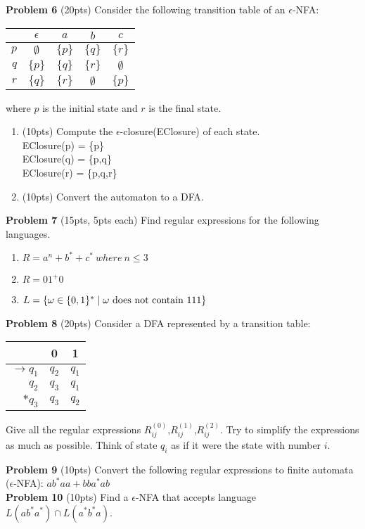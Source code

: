 \documentclass{article}
\begin{document}
\noindent \textbf{Problem 6} (20pts) Consider the following transition table of an $\epsilon$-NFA:
    \begin{center}
    \small
        \begin{tabular}{r||c|c|c|c}
        & $\epsilon$ & $a$ & $b$ & $c$\\ \hline\hline
        $p$ & $\emptyset$ & $\{p\}$ & $\{q\}$ & $\{r\}$\\ 
        $q$ & $\{p\}$ & $\{q\}$ & $\{r\}$ & $\emptyset$\\ 
        $r$ & $\{q\}$ & $\{r\}$ & $\emptyset$ & $\{p\}$\\ 
        \end{tabular}
    \end{center}
    where $p$ is the initial state and $r$ is the final state.
    \begin{enumerate}
        \item (10pts) Compute the $\epsilon$-closure(EClosure) of each state.\\
EClosure(p) = \{p\}\\
EClosure(q) = \{p,q\}\\
EClosure(r) = \{p,q,r\}\\

        \item (10pts) Convert the automaton to a DFA.
    \end{enumerate}
    
\noindent \textbf{Problem 7} (15pts, 5pts each) Find regular expressions for the following languages.
\begin{enumerate}
    \item $R = a^n+b^*+c^* \ where\ n \leq3$
    \item $R=01^{+}0$
    
    \item $L = \{ \omega \in \{ 0,1 \}^* \mid \omega \mbox{ does not contain 111} \}$ 
\end{enumerate}

\noindent \textbf{Problem 8} (20pts) Consider a DFA represented by a transition table:
\begin{center}
\small
\begin{tabular}{r|c|c}
& 0 & 1 \\ \hline
$\rightarrow q_1$ & $q_2$ & $q_1$ \\ 
$q_2$ & $q_3$ & $q_1$ \\ 
$*q_3$ & $q_3$ & $q_2$
\end{tabular}
\end{center}
Give all the regular expressions $R^{(0)}_{ij}$,$R^{(1)}_{ij}$,$R^{(2)}_{ij}$. Try to simplify the expressions as much as possible.
Think of state $q_i$ as if it were the state with number $i$.

\noindent \newline \textbf{Problem 9} (10pts) Convert the following regular expressions to finite automata ($\epsilon$-NFA): $ab^*aa+bba^*ab$ \\

\noindent \textbf{Problem 10} (10pts) Find a $\epsilon$-NFA that accepts language $L(ab^*a^*)\cap L(a^*b^*a)$.
\end{document}
